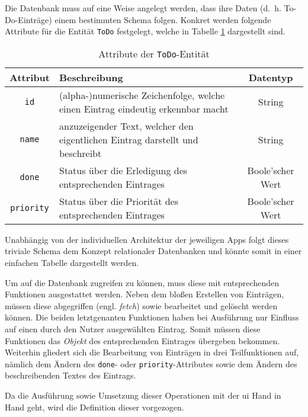 Die Datenbank muss auf eine Weise angelegt werden, dass ihre Daten (d.\ h. To-Do-Einträge) einem bestimmten Schema folgen. Konkret werden folgende Attribute für die Entität \texttt{ToDo} festgelegt, welche in Tabelle \ref{tab:entity} dargestellt sind.

{\setlength{\extrarowheight}{3pt}%
\begin{table}[h!]
	\centering
	\begin{tabular}{c|>{\centering\arraybackslash}p{9cm}|c}
		\textbf{Attribut} & \textbf{Beschreibung} & \textbf{Datentyp} \\ \hline 
		\texttt{id}          & (alpha-)numerische Zeichenfolge, welche einen Eintrag eindeutig erkennbar macht                    & String   \\
		\texttt{name}            & anzuzeigender Text, welcher den eigentlichen Eintrag darstellt und beschreibt                   & String                              \\
		\texttt{done}   & Status über die Erledigung des entsprechenden Eintrages                    & Boole'scher Wert \\
		\texttt{priority}   & Status über die Priorität des entsprechenden Eintrages                    & Boole'scher Wert \\                                  
	\end{tabular}
	\caption{Attribute der \texttt{ToDo}-Entität} \label{tab:entity}
\end{table}
}


Unabhängig von der individuellen Architektur der jeweiligen Apps folgt dieses triviale Schema dem Konzept relationaler Datenbanken und könnte somit in einer einfachen Tabelle dargestellt werden.

Um auf die Datenbank zugreifen zu können, muss diese mit entsprechenden Funktionen ausgestattet werden. Neben dem bloßen Erstellen von Einträgen, müssen diese abgegriffen (engl. \textit{fetch}) sowie bearbeitet und gelöscht werden können. Die beiden letztgenanten Funktionen haben bei Ausführung nur Einfluss auf einen durch den Nutzer ausgewählten Eintrag. Somit müssen diese Funktionen das \textit{Objekt} des entsprechenden Eintrages übergeben bekommen. Weiterhin gliedert sich die Bearbeitung von Einträgen in drei Teilfunktionen auf, nämlich dem Ändern des \texttt{done}- oder \texttt{priority}-Attributes sowie dem Ändern des beschreibenden Textes des Eintrags.

Da die Ausführung sowie Umsetzung dieser Operationen mit der \ac{ui} Hand in Hand geht, wird die Definition dieser vorgezogen.
